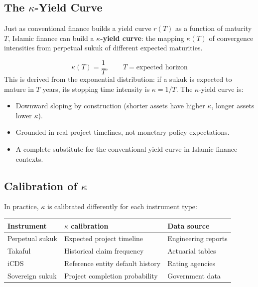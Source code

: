 \documentclass[10pt,twocolumn]{article}
\theoremstyle{plain}
\theoremstyle{definition}
\begin{document}
\subsection{The $\kappa$-Yield Curve}

Just as conventional finance builds a yield curve $r(T)$ as a
function of maturity $T$, Islamic finance can build a
\textbf{$\kappa$-yield curve}: the mapping $\kappa(T)$ of
convergence intensities from perpetual sukuk of different
expected maturities.

\begin{equation}
\kappa(T) = \frac{1}{T}, \qquad T = \text{expected horizon}
\label{eq:kappa_curve}
\end{equation}
This is derived from the exponential distribution: if a sukuk is
expected to mature in $T$ years, its stopping time intensity is
$\kappa = 1/T$. The $\kappa$-yield curve is:
\begin{itemize}[leftmargin=*,noitemsep]
\item Downward sloping by construction (shorter assets have higher
$\kappa$, longer assets lower $\kappa$).
\item Grounded in real project timelines, not monetary policy
expectations.
\item A complete substitute for the conventional yield curve in
Islamic finance contexts.
\end{itemize}

\subsection{Calibration of $\kappa$}

In practice, $\kappa$ is calibrated differently for each
instrument type:
\begin{center}
\small
\begin{tabular}{@{}lll@{}}
\toprule
\textbf{Instrument} & \textbf{$\kappa$ calibration} & \textbf{Data source}\\
\midrule
Perpetual sukuk & Expected project timeline & Engineering reports\\
Takaful & Historical claim frequency & Actuarial tables\\
iCDS & Reference entity default history & Rating agencies\\
Sovereign sukuk & Project completion probability & Government data\\
\bottomrule
\end{tabular}
\end{center}
\end{document}
